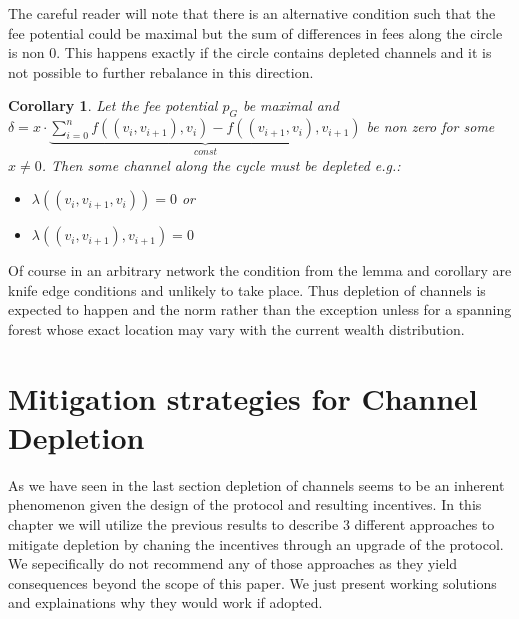 \documentclass[10pt,twocolumn]{article}
\newtheorem{corollary}{Corollary}[theorem]
\begin{document}
The careful reader will note that there is an alternative condition such that the fee potential could be maximal but the sum of differences in fees along the circle is non $0$.
This happens exactly if the circle contains depleted channels and it is not possible to further rebalance in this direction.

\begin{corollary}
  Let the fee potential $p_G$ be maximal and $\delta = x \cdot \underbrace{\sum_{i=0}^{n} f((v_i, v_{i+1}),v_i) - f((v_{i+1}, v_{i}),v_{i+1})}_{const}$ be non zero for some $x\neq 0$.
  Then some channel along the cycle must be depleted e.g.:
  \begin{itemize}
  \item $\lambda((v_i,v_{i+1},v_i)) = 0$ or
  \item $\lambda((v_i,v_{i+1}),v_{i+1})=0$
  \end{itemize}
\end{corollary}

Of course in an arbitrary network the condition from the lemma and corollary are knife edge conditions and unlikely to take place.
Thus depletion of channels is expected to happen and the norm rather than the exception unless for a spanning forest whose exact location may vary with the current wealth distribution.

\section{Mitigation strategies for Channel Depletion}
As we have seen in the last section depletion of channels seems to be an inherent phenomenon given the design of the protocol and resulting incentives.
In this chapter we will utilize the previous results to describe $3$ different approaches to mitigate depletion by chaning the incentives through an upgrade of the protocol.
We sepecifically do not recommend any of those approaches as they yield consequences beyond the scope of this paper. We just present working solutions and explainations why they would work if adopted.
\end{document}
